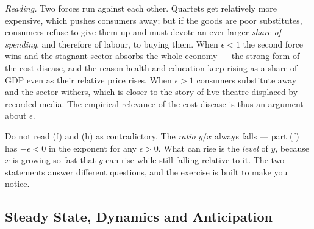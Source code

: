 \documentclass[12pt, letterpaper]{article}
\begin{document}
\begin{tcolorbox}[oddbox,title={Problem 9.3 \quad Baumol's Cost Disease}]
\begin{enumerate}
\emph{Reading.} Two forces run against each other. Quartets get relatively more expensive,
which pushes consumers away; but if the goods are poor substitutes, consumers refuse to give
them up and must devote an ever-larger \emph{share of spending}, and therefore of labour, to
buying them. When $\epsilon<1$ the second force wins and the stagnant sector absorbs the whole
economy --- the strong form of the cost disease, and the reason health and education keep rising
as a share of GDP even as their relative price rises. When $\epsilon>1$ consumers substitute
away and the sector withers, which is closer to the story of live theatre displaced by recorded
media. The empirical relevance of the cost disease is thus an argument about $\epsilon$.
\end{enumerate}

\begin{tcolorbox}[trapbox]
Do not read (f) and (h) as contradictory. The \emph{ratio} $y/x$ always falls --- part (f) has
$-\epsilon<0$ in the exponent for any $\epsilon>0$. What can rise is the \emph{level} of $y$,
because $x$ is growing so fast that $y$ can rise while still falling relative to it. The two
statements answer different questions, and the exercise is built to make you notice.
\end{tcolorbox}
\end{tcolorbox}

\subsection{Steady State, Dynamics and Anticipation}
\end{document}
